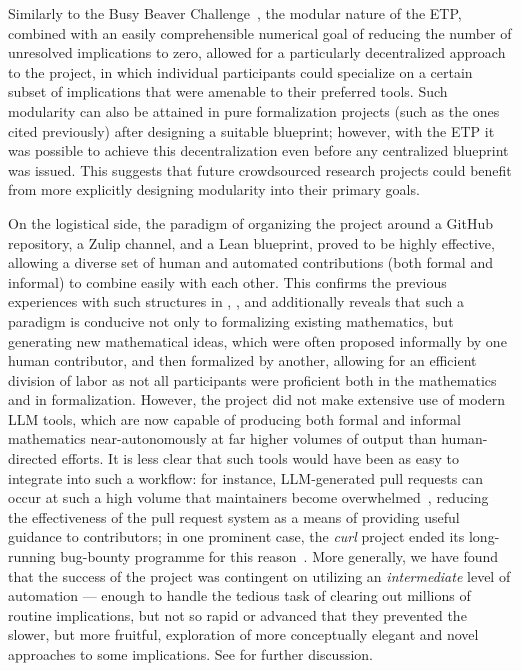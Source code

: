 Similarly to the Busy Beaver Challenge~\cite{bbchallenge_bb5}, the modular nature of the ETP, combined with an easily comprehensible numerical goal of reducing the number of unresolved implications to zero, allowed for a particularly decentralized approach to the project, in which individual participants could specialize on a certain subset of implications that were amenable to their preferred tools.  Such modularity can also be attained in pure formalization projects (such as the ones cited previously) after designing a suitable blueprint; however, with the ETP it was possible to achieve this decentralization even before any centralized blueprint was issued. This suggests that future crowdsourced research projects could benefit from more explicitly designing modularity into their primary goals.

On the logistical side, the paradigm of organizing the project around a GitHub repository, a Zulip channel, and a Lean blueprint, proved to be highly effective, allowing a diverse set of human and automated contributions (both formal and informal) to combine easily with each other.  This confirms the previous experiences with such structures in \cite{LTE_Scholze_2022, lean_liquid}, \cite{PFR_Tao_Dilles_2023}, and additionally reveals that such a paradigm is conducive not only to formalizing existing mathematics, but generating new mathematical ideas, which were often proposed informally by one human contributor, and then formalized by another, allowing for an efficient division of labor as not all participants were proficient both in the mathematics and in formalization.  However, the project did not make extensive use of modern LLM tools, which are now capable of producing both formal and informal mathematics near-autonomously at far higher volumes of output than human-directed efforts.  It is less clear that such tools would have been as easy to integrate into such a workflow: for instance, LLM-generated pull requests can occur at such a high volume that maintainers become overwhelmed~\cite{ai_slop_oss}, reducing the effectiveness of the pull request system as a means of providing useful guidance to contributors; in one prominent case, the \emph{curl} project ended its long-running bug-bounty programme for this reason~\cite{curl_bugbounty}.
More generally, we have found that the success of the project was contingent on utilizing an \emph{intermediate} level of automation --- enough to handle the tedious task of clearing out millions of routine implications, but not so rapid or advanced that they prevented the slower, but more fruitful, exploration of more conceptually elegant and novel approaches to some implications.  See  for further discussion.

